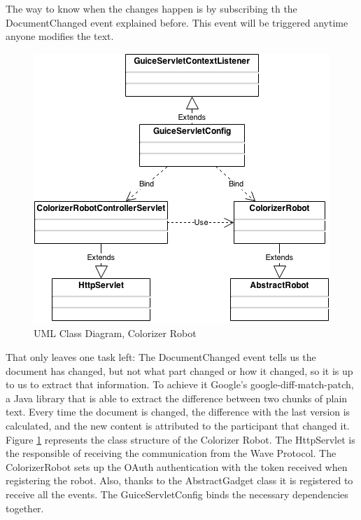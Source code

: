 The way to know when the changes happen is by subscribing th the DocumentChanged event explained before. This event will be triggered anytime anyone modifies the text.\\[.2cm]
\begin{figure}[h]
  \center
    \includegraphics[keepaspectratio, scale=0.5]{Media/Diagrams/Robot/Colorizer.png}
  \caption{UML Class Diagram, Colorizer Robot}
  \label{fig:colorizer_diagram}
\end{figure}
That only leaves one task left: The DocumentChanged event tells us the document has changed, but not what part changed or how it changed, so it is up to us to extract that information. To achieve it Google's google-diff-match-patch, a Java library that is able to extract the difference between two chunks of plain text. Every time the document is changed, the difference with the last version is calculated, and the new content is attributed to the participant that changed it.\\[.2cm]
Figure \ref{fig:colorizer_diagram} represents the class structure of the Colorizer Robot. The HttpServlet is the responsible of receiving the communication from the Wave Protocol. The ColorizerRobot sets up the OAuth authentication with the token received when registering the robot. Also, thanks to the AbstractGadget class it is registered to receive all the events. The GuiceServletConfig binds the necessary dependencies together.\\[.2cm]

